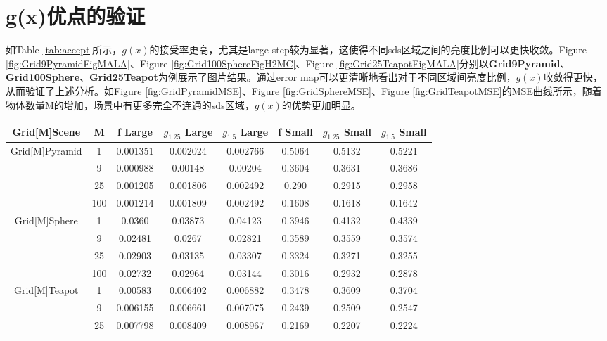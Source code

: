 
\section{g(x)优点的验证}
\label{sec:benefit}
如Table \ref{tab:accept}所示，$g(x)$的接受率更高，尤其是large step较为显著，这使得不同sds区域之间的亮度比例可以更快收敛。Figure \ref{fig:Grid9PyramidFigMALA}、Figure \ref{fig:Grid100SphereFigH2MC}、Figure \ref{fig:Grid25TeapotFigMALA}分别以\textbf{Grid9Pyramid}、\textbf{Grid100Sphere}、\textbf{Grid25Teapot}为例展示了图片结果。通过error map可以更清晰地看出对于不同区域间亮度比例，$g(x)$收敛得更快，从而验证了上述分析。如Figure \ref{fig:GridPyramidMSE}、Figure \ref{fig:GridSphereMSE}、Figure \ref{fig:GridTeapotMSE}的MSE曲线所示，随着物体数量M的增加，场景中有更多完全不连通的sds区域，$g(x)$的优势更加明显。

\begin{table}[hb]
\centering
\begin{tabular}{|c|c|c|c|c|c|c|c|}
\hline
Grid[M]Scene & M & f Large & $g_{1.25}$ Large & $g_{1.5}$ Large & f Small & $g_{1.25}$ Small & $g_{1.5}$ Small \\
\hline
\multirow{4}{*}{Grid[M]Pyramid} & 1 & 0.001351 & 0.002024 & 0.002766 & 0.5064 & 0.5132 & 0.5221\\
\cline{2-8} & 9 & 0.000988 & 0.00148 & 0.00204 & 0.3604 & 0.3631 & 0.3686\\
\cline{2-8} & 25 & 0.001205 & 0.001806 & 0.002492 & 0.290 & 0.2915 & 0.2958\\
\cline{2-8} & 100 & 0.001214 & 0.001809 & 0.002492 & 0.1608 & 0.1618 & 0.1642\\
\hline
\multirow{4}{*}{Grid[M]Sphere} & 1 & 0.0360 & 0.03873 & 0.04123 & 0.3946 & 0.4132 & 0.4339\\
\cline{2-8} & 9 & 0.02481 & 0.0267 & 0.02821 & 0.3589 & 0.3559 & 0.3574\\
\cline{2-8} & 25 & 0.02903 & 0.03135 & 0.03307 & 0.3324 & 0.3271 & 0.3255\\
\cline{2-8} & 100 & 0.02732 & 0.02964 & 0.03144 & 0.3016 & 0.2932 & 0.2878\\
\hline
\multirow{4}{*}{Grid[M]Teapot} & 1 & 0.00583 & 0.006402 & 0.006882 & 0.3478 & 0.3609 & 0.3704\\
\cline{2-8} & 9 & 0.006155 & 0.006661 & 0.007075 & 0.2439 & 0.2509 & 0.2547\\
\cline{2-8} & 25  & 0.007798 & 0.008409 & 0.008967 & 0.2169 & 0.2207 & 0.2224\\

\end{tabular}
\end{table}
